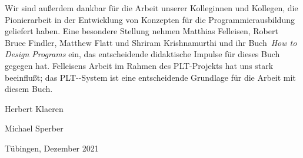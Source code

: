 Wir sind außerdem dankbar für die Arbeit unserer Kolleginnen und Kollegen, die
Pionierarbeit in der Entwicklung von Konzepten für die
Programmierausbildung geliefert haben.  Eine besondere
Stellung nehmen Matthias Felleisen, Robert Bruce Findler, Matthew
Flatt und Shriram Krishnamurthi und ihr Buch~\textit{How to Design
  Programs} \cite{FelleisenFindlerFlattKrishnamurthi2001} ein, das
entscheidende didaktische Impulse für dieses Buch gegegen hat.
Felleisens Arbeit im Rahmen des PLT-Projekts hat uns stark beeinflußt;
das PLT-\drscheme{}-System ist eine entscheidende Grundlage für die
Arbeit mit diesem Buch.


\begin{flushright}
  Herbert Klaeren

  Michael Sperber

  Tübingen, Dezember 2021
\end{flushright}


\newpage

\thispagestyle{empty}


